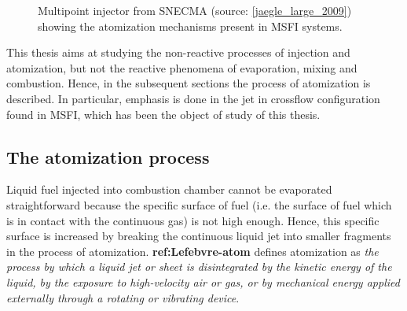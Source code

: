 
\begin{figure}[ht]
     \centering
      \caption{Multipoint injector from SNECMA (source: \ref{jaegle_large_2009}) showing the atomization mechanisms present in MSFI systems.}
      \label{fig:multipoint_injector_snecma}
\end{figure}

This thesis aims at studying the non-reactive processes of injection and atomization, but not the reactive phenomena of evaporation, mixing and combustion. Hence, in the subsequent sections the process of atomization is described. In particular, emphasis is done in the jet in crossflow configuration found in MSFI, which has been the object of study of this thesis.

\subsection*{The atomization process}

Liquid fuel injected into combustion chamber cannot be evaporated straightforward because the specific surface of fuel (i.e. the surface of fuel which is in contact with the continuous gas) is not high enough. Hence, this specific surface is increased by breaking the continuous liquid jet into smaller fragments in the process of atomization. \textbf{ref:Lefebvre-atom} defines atomization as \textsl{the process by which a liquid jet or sheet is disintegrated by the kinetic energy of the liquid, by the exposure to
high-velocity air or gas, or by mechanical energy applied externally through a rotating or vibrating device}.

